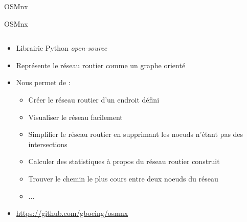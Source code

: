 \documentclass[aspectratio=169]{beamer}
\begin{document}
\begin{frame}{OSMnx \cite{boeing2017osmnx}}

\begin{center}
{\LARGE OSMnx}
\end{center}

\begin{columns}
\begin{column}{0.75\textwidth}
	
	\begin{itemize}
		\item Librairie Python \textit{open-source}
		\item Représente le réseau routier comme un graphe orienté
		\item Nous permet de :
		\begin{itemize}
			\item Créer le réseau routier d'un endroit défini
			\item Visualiser le réseau facilement
			\item Simplifier le réseau routier en supprimant les noeuds n'étant pas des intersections
			\item Calculer des statistiques à propos du réseau routier construit
			\item Trouver le chemin le plus cours entre deux noeuds du réseau
			\item ...
		\end{itemize}
		\item \url{https://github.com/gboeing/osmnx}
	\end{itemize}
\end{column}
\begin{column}{0.25\textwidth}  %
    \begin{center}

\end{center}
\end{column}
\end{columns}
\end{frame}
\end{document}
